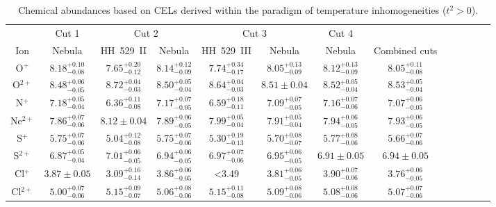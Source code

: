 \documentclass[fleqn,usenatbib]{mnras}
\begin{document}
\begin{table*}
\centering
\caption{Chemical abundances based on CELs derived within the paradigm of temperature inhomogeneities ($t^2>0$).}
\label{tab:cels_abundances_witht2}
\begin{adjustbox}{width=\textwidth}
\begin{tabular}{ccccccccccccc}
\hline
 & \multicolumn{1}{c}{Cut 1} & \multicolumn{2}{c}{Cut 2} & \multicolumn{2}{c}{Cut 3} & \multicolumn{1}{c}{Cut 4} \\
Ion &  Nebula & HH~529~II &  Nebula & HH~529~III &  Nebula &  Nebula & Combined cuts\\
\hline


O$^{+}$ & $8.18^{+0.10} _{-0.08}$  & $7.65^{+0.20} _{-0.12}$ & $8.14^{+0.12} _{-0.09}$ & $7.74^{+0.34} _{-0.17}$  & $8.05^{+0.13} _{-0.09}$  & $8.12^{+0.13} _{-0.09}$ & $8.05^{+0.11} _{-0.08}$  \\

O$^{2+}$ & $8.48^{+0.06} _{-0.05}$ & $8.72^{+0.04} _{-0.03}$ & $8.50^{+0.05} _{-0.04}$ &  $8.64^{+0.04} _{-0.03}$ & $8.51 \pm 0.04$ & $8.52^{+0.05} _{-0.04}$ & $8.53^{+0.05} _{-0.04}$  \\

N$^{+}$  & $7.18^{+0.05} _{-0.04}$ & $6.36^{+0.11} _{-0.08}$& $7.17^{+0.07} _{-0.05}$ &  $6.59^{+0.18} _{-0.11}$ & $7.09^{+0.07} _{-0.05}$ & $7.16^{+0.07} _{-0.06}$ & $7.07^{+0.06} _{-0.05}$  \\

Ne$^{2+}$ & $7.86^{+0.07} _{-0.06}$ & $8.12 \pm 0.04 $ & $7.89^{+0.06} _{-0.05}$  &  $7.99^{+0.05} _{-0.04}$ & $7.91^{+0.05} _{-0.04}$ & $7.94^{+0.06} _{-0.05}$ & $7.93^{+0.06} _{-0.05}$  \\

S$^{+}$ & $5.75^{+0.07} _{-0.06}$ & $5.04^{+0.12} _{-0.08}$  & $5.75^{+0.07} _{-0.06}$ &$5.30^{+0.19} _{-0.13}$   & $5.70^{+0.08} _{-0.07}$  & $5.77^{+0.08} _{-0.06}$ &  $5.66^{+0.07} _{-0.06}$  \\

S$^{2+}$& $6.87^{+0.05} _{-0.04}$& $7.01^{+0.06} _{-0.05}$  & $6.94^{+0.06} _{-0.05}$  & $6.97^{+0.07} _{-0.06}$  & $6.95^{+0.06} _{-0.05}$ & $6.91 \pm 0.05$ & $6.94 \pm 0.05$  \\

Cl$^{+}$ & $3.87 \pm 0.05$ & $3.09^{+0.16} _{-0.14}$ & $3.86^{+0.06} _{-0.05}$ & <3.49  & $3.81^{+0.06} _{-0.05}$ & $3.90^{+0.07} _{-0.06}$ & $3.76^{+0.06} _{-0.05}$   \\

Cl$^{2+}$ & $5.00^{+0.07} _{-0.06}$ & $5.15^{+0.09} _{-0.07}$ &$5.06^{+0.08} _{-0.06}$& $5.15^{+0.11} _{-0.08}$  & $5.09^{+0.08} _{-0.06}$ & $5.08^{+0.08} _{-0.06}$ & $5.07^{+0.07} _{-0.06}$  \\


\end{tabular}
\end{adjustbox}
\end{table*}
\end{document}
